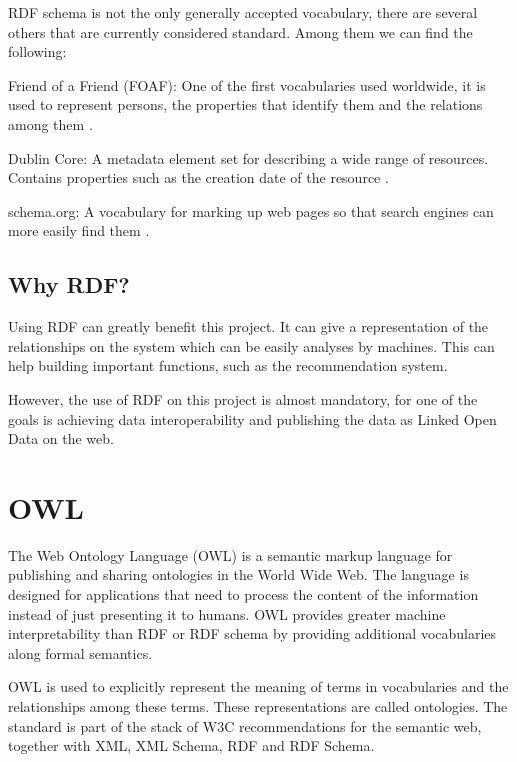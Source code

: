 RDF schema is not the only generally accepted vocabulary, there are several others that are currently considered standard. Among them we can find the following:

\begin{description}
	\item{Friend of a Friend (FOAF):} One of the first vocabularies used worldwide, it is used to represent persons, the properties that identify them and the relations among them \cite{foafspec}.
	
	\item{Dublin Core:} A metadata element set for describing a wide range of resources. Contains properties such as the creation date of the resource \cite{dublincorespec}.
	
	\item{schema.org: } A vocabulary for marking up web pages so that search engines can more easily find them \cite{schemaspec}.
\end{description}

\subsection*{Why RDF?}

Using RDF can greatly benefit this project. It can give a representation of the relationships on the system which can be easily analyses by machines. This can help building important functions, such as the recommendation system.

However, the use of RDF on this project is almost mandatory, for one of the goals is achieving data interoperability and publishing the data as Linked Open Data on the web.

\section{OWL}\label{sec:owl}

The Web Ontology Language (OWL) is a semantic markup language for publishing and sharing ontologies in the World Wide Web\cite{bechhofer2009owl}. The language is designed for applications that need to process the content of the information instead of just presenting it to humans. OWL provides greater machine interpretability than RDF or RDF schema by providing additional vocabularies along formal semantics.

OWL is used to explicitly represent the meaning of terms in vocabularies and the relationships among these terms. These representations are called ontologies\cite{mcguinness2004owl}. The standard is part of the stack of W3C recommendations for the semantic web, together with XML, XML Schema, RDF and RDF Schema.

